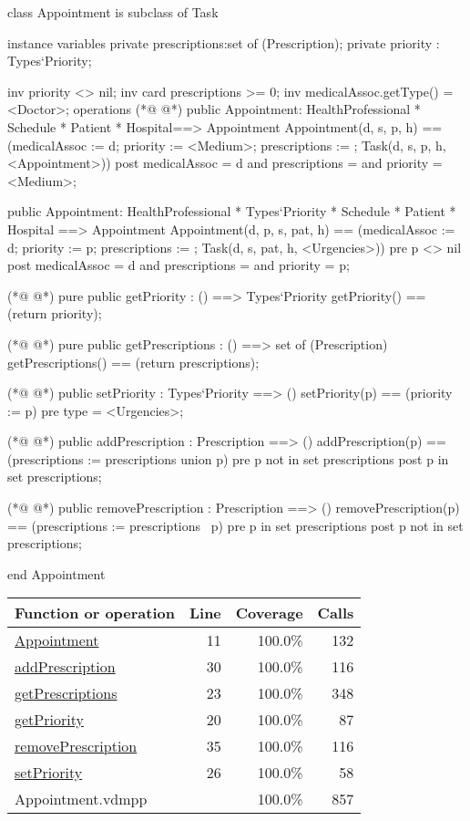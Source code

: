 \begin{vdmpp}[breaklines=true]
class Appointment is subclass of Task

instance variables
  private prescriptions:set of (Prescription);
  private priority : Types`Priority;
  
  inv priority <> nil;
  inv card prescriptions >= 0;
  inv medicalAssoc.getType() = <Doctor>;
operations
(*@
\label{Appointment:11}
@*)
 public Appointment: HealthProfessional * Schedule * Patient * Hospital==> Appointment
  Appointment(d, s, p, h) == (medicalAssoc := d; priority := <Medium>; prescriptions := {}; Task(d, s, p, h, <Appointment>))
 post medicalAssoc = d and prescriptions = {} and priority = <Medium>;
 
 public Appointment: HealthProfessional * Types`Priority * Schedule * Patient * Hospital ==> Appointment
  Appointment(d, p, s, pat, h) == (medicalAssoc := d; priority := p; prescriptions := {}; Task(d, s, pat, h, <Urgencies>))
 pre p <> nil
 post medicalAssoc = d and prescriptions = {} and priority = p;

(*@
\label{getPriority:20}
@*)
 pure public getPriority : () ==> Types`Priority
  getPriority() == (return priority);
 
(*@
\label{getPrescriptions:23}
@*)
  pure public getPrescriptions : () ==> set of (Prescription)
   getPrescriptions() == (return prescriptions);
  
(*@
\label{setPriority:26}
@*)
  public setPriority : Types`Priority ==> ()
   setPriority(p) == (priority := p)
  pre type = <Urgencies>;
  
(*@
\label{addPrescription:30}
@*)
  public addPrescription : Prescription ==> ()
   addPrescription(p) == (prescriptions := prescriptions union {p})
  pre p not in set prescriptions
  post p in set prescriptions;
                 
(*@
\label{removePrescription:35}
@*)
 public removePrescription : Prescription ==> ()
   removePrescription(p) == (prescriptions := prescriptions \ {p})
  pre p in set prescriptions
  post p not in set prescriptions;
   
end Appointment
\end{vdmpp}
\bigskip
\begin{longtable}{|l|r|r|r|}
\hline
Function or operation & Line & Coverage & Calls \\
\hline
\hline
\hyperref[Appointment:11]{Appointment} & 11&100.0\% & 132 \\
\hline
\hyperref[addPrescription:30]{addPrescription} & 30&100.0\% & 116 \\
\hline
\hyperref[getPrescriptions:23]{getPrescriptions} & 23&100.0\% & 348 \\
\hline
\hyperref[getPriority:20]{getPriority} & 20&100.0\% & 87 \\
\hline
\hyperref[removePrescription:35]{removePrescription} & 35&100.0\% & 116 \\
\hline
\hyperref[setPriority:26]{setPriority} & 26&100.0\% & 58 \\
\hline
\hline
Appointment.vdmpp & & 100.0\% & 857 \\
\hline
\end{longtable}

